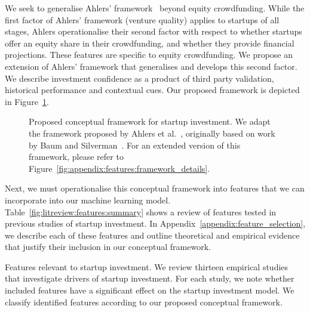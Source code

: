 \documentclass[../thesis/thesis.tex]{subfiles}
\begin{document}
We seek to generalise Ahlers' framework~\cite{ahlers2015} beyond equity crowdfunding. While the first factor of Ahlers' framework (venture quality) applies to startups of all stages, Ahlers operationalise their second factor with respect to whether startups offer an equity share in their crowdfunding, and whether they provide financial projections. These features are specific to equity crowdfunding. We propose an extension of Ahlers' framework that generalises and develops this second factor. We describe investment confidence as a product of third party validation, historical performance and contextual cues. Our proposed framework is depicted in Figure~\ref{fig:litreview:features:framework_simple}.

\begin{figure}[!htb]
    \centering
    
    \caption[Conceptual framework for startup investment.]{Proposed conceptual framework for startup investment. We adapt the framework proposed by Ahlers et al.~\cite{ahlers2015}, originally based on work by Baum and Silverman~\cite{baum2004}. For an extended version of this framework, please refer to Figure~\ref{fig:appendix:features:framework_details}.}
    \label{fig:litreview:features:framework_simple}
\end{figure}

Next, we must operationalise this conceptual framework into features that we can incorporate into our machine learning model. Table~\ref{fig:litreview:features:summary} shows a review of features tested in previous studies of startup investment. In Appendix~\ref{appendix:feature_selection}, we describe each of these features and outline theoretical and empirical evidence that justify their inclusion in our conceptual framework.

\begin{table}[!htb]
    \centering
    \scalebox{1}{
        
    }
    \caption[Features relevant to startup investment]{Features relevant to startup investment. We review thirteen empirical studies that investigate drivers of startup investment. For each study, we note whether included features have a significant effect on the startup investment model. We classify identified features according to our proposed conceptual framework.}
    \label{fig:litreview:features:summary}
\end{table}
\end{document}
